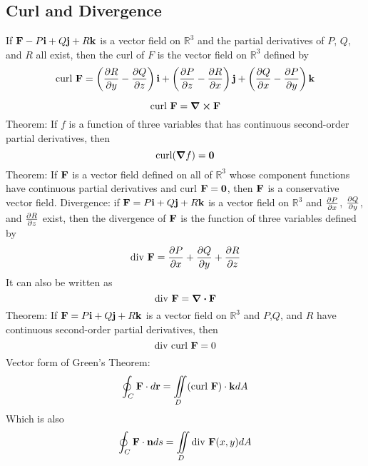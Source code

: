 \documentclass{article}
\begin{document}
    \subsection{Curl and Divergence}
    \begin{outline}
        \1 If \(\vb F-P\vb i+Q\vb j+R\vb k\) is a vector field on \(\mathbb R^3\) and the partial derivatives of $P$, $Q$, and $R$ all exist, then the curl of $F$ is the vector field on \(\mathbb R^3\) defined by \[\text{curl }\vb F=\left(\pdv{R}{y}-\pdv{Q}{z}\right)\vb i+\left(\pdv{P}{z}-\pdv{R}{x}\right)\vb j+\left(\pdv{Q}{x}-\pdv{P}{y}\right)\vb k\] 
    \end{outline}\begin{multicols}{2}
        
        \begin{outline}
        \1 \[\text{curl }\vb F=\curl\vb F\]
        \1 Theorem: If $f$ is a function of three variables that has continuous second-order partial derivatives, then \[\text{curl}(\grad f)=\vb 0\]
        \1 Theorem: If \(\vb F\) is a vector field defined on all of \(\mathbb R^3\) whose component functions have continuous partial derivatives and curl \(\vb F=\vb 0\), then \(\vb F\) is a conservative vector field. 
        \1 Divergence: if \(\vb F=P\vb i+Q\vb j+R\vb k\) is a vector field on \(\mathbb R^3\) and \(\pdv{P}{x}\), \(\pdv{Q}{y}\), and \(\pdv{R}{z}\) exist, then the divergence of \(\vb F\) is the function of three variables defined by \[\text{div }\vb F=\pdv{P}{x}+\pdv{Q}{y}+\pdv{R}{z}\] It can also be written as \[\text{div }\vb F=\div \vb F\]
        \1 Theorem: If \(\vb F=P\vb i+Q\vb j+R\vb k\) is a vector field on \(\mathbb R^3\) and \(P\),\(Q\), and \(R\) have continuous second-order partial derivatives, then \[\text{div curl }\vb F=0\]
        \1 Vector form of Green's Theorem: \[\oint_C\vb F\cdot d\vb r=\iint\limits_D(\text{curl }\vb F)\cdot\vb kdA\]
        \1 Which is also \[\oint_C\vb F\cdot\vb nds=\iint\limits_D\text{div }\vb F(x,y)dA\]

    \end{outline}\end{multicols}
\end{document}
